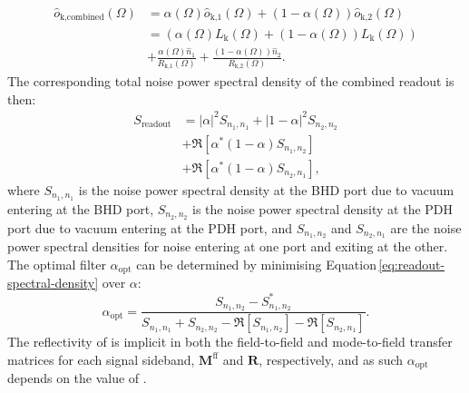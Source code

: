 \begin{equation}
  \begin{split}
    \hat{o}_{\textrm{k,combined}} \left( \Omega \right) &= \alpha\left( \Omega \right) \hat{o}_{\textrm{k,1}} \left( \Omega \right) + \left( 1 - \alpha\left( \Omega \right) \right) \hat{o}_{\textrm{k,2}} \left( \Omega \right) \\
    &= \left( \alpha\left( \Omega \right) L_{\textrm{k}} \left( \Omega \right) + \left(1 - \alpha\left( \Omega \right) \right) L_{\textrm{k}} \left( \Omega \right) \right) \\
    &+ \frac{\alpha\left( \Omega \right) \hat{n}_{\textrm{1}}}{R_{\textrm{k,1}}\left(\Omega\right)} + \frac{\left( 1 - \alpha\left( \Omega \right) \right) \hat{n}_{\textrm{2}}}{R_{\textrm{k,2}} \left(\Omega\right)}.
  \end{split}
\end{equation}      
The corresponding total noise power spectral density of the combined readout is then:
\begin{equation}
  \label{eq:readout-spectral-density}
  \begin{split}
    S_{\textrm{readout}} &= \left| \alpha \right|^{2} S_{n_{1},n_{1}} + \left| 1 - \alpha \right|^{2} S_{n_{2},n_{2}} \\
    &+ \Re \left[ \alpha^* \left(1 - \alpha \right) S_{n_{1},n_{2}} \right] \\
    &+ \Re \left[ \alpha^* \left(1 - \alpha \right) S_{n_{2},n_{1}} \right],
  \end{split}
\end{equation}
where $S_{n_{1},n_{1}}$ is the noise power spectral density at the \gls{BHD} port due to vacuum entering at the \gls{BHD} port, $S_{n_{2},n_{2}}$ is the noise power spectral density at the \gls{PDH} port due to vacuum entering at the \gls{PDH} port, and $S_{n_{1},n_{2}}$ and $S_{n_{2},n_{1}}$ are the noise power spectral densities for noise entering at one port and exiting at the other. The optimal filter $\alpha_{\textrm{opt}}$ can be determined by minimising Equation\,\ref{eq:readout-spectral-density} over $\alpha$:
\begin{equation}
  \label{eq:optimal-filter}
  \alpha_{\textrm{opt}} = \frac{S_{n_{1},n_{2}} - S^*_{n_{1},n_{2}}}{S_{n_{1},n_{1}} + S_{n_{2},n_{2}} - \Re \left[ S_{n_{1},n_{2}} \right] - \Re \left[ S_{n_{2},n_{1}} \right]}.
\end{equation}
The reflectivity of \MINT{} is implicit in both the field-to-field and mode-to-field transfer matrices for each signal sideband, $\mathbf{M}^{\textrm{ff}}$ and $\mathbf{R}$, respectively, and as such $\alpha_{\textrm{opt}}$ depends on the value of \MINT{}.


